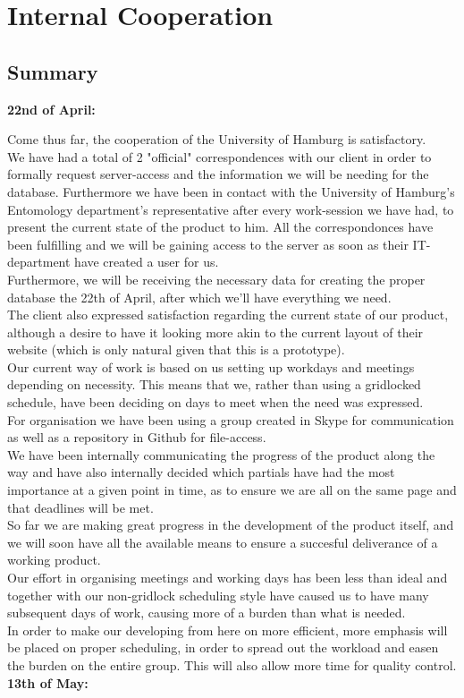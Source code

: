 \documentclass[12pt,a4paper]{article}
\begin{document}
\newpage

\section{Internal Cooperation}
\subsection{Summary}

{\bf 22nd of April:}

Come thus far, the cooperation of the University of Hamburg is satisfactory.\\
We have had a total of 2 "official" correspondences with our client in order to formally request server-access and the information we will be needing for the database. Furthermore we have been in contact with the University of Hamburg's Entomology department's representative after every work-session we have had, to present the current state of the product to him.
All the correspondonces have been fulfilling and we will be gaining access to the server as soon as their IT-department have created a user for us.\\ Furthermore, we will be receiving the necessary data for creating the proper database the 22th of April, after which we'll have everything we need. \\
The client also expressed satisfaction regarding the current state of our product, although a desire to have it looking more akin to the current layout of their website (which is only natural given that this is a prototype).\\
Our current way of work is based on us setting up workdays and meetings depending on necessity. This means that we, rather than using a gridlocked schedule, have been deciding on days to meet when the need was expressed.\\
For organisation we have been using a group created in Skype for communication as well as a repository in Github for file-access. \\
We have been internally communicating the progress of the product along the way and have also internally decided which partials have had the most importance at a given point in time, as to ensure we are all on the same page and that deadlines will be met.\\

So far we are making great progress in the development of the product itself, and we will soon have all the available means to ensure a succesful deliverance of a working product.\\
Our effort in organising meetings and working days has been less than ideal and together with our non-gridlock scheduling style have caused us to have many subsequent days of work, causing more of a burden than what is needed.\\
In order to make our developing from here on more efficient, more emphasis will be placed on proper scheduling, in order to spread out the workload and easen the burden on the entire group. This will also allow more time for quality control.\\
\newpage
{\bf 13th of May:}
\end{document}
